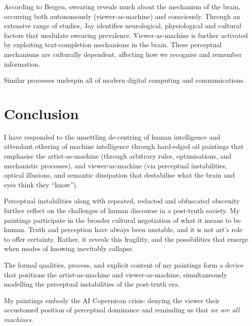 \documentclass[12pt]{article}
\begin{document}
According to Bergen, swearing reveals much about the mechanism of the
brain, occurring both autonomously (viewer-as-machine) and
consciously.\cite{bergen2018what} Through an extensive range of
studies, Jay identifies neurological, physiological and cultural
factors that modulate swearing prevalence.\cite{jay1999why}
Viewer-as-machine is further activated by exploiting text-completion
mechanisms in the
brain.\cite{Taylor1953,Reicher1969,Healy1976,GraingerWhitney2004,CohenDehaene2000,Levy2008} These
perceptual mechanisms are culturally
dependent,\cite{Bartlett1932,Hall1976,ChuaBolandNisbett2005,MasudaNisbett2001}
affecting how we recognise and remember information.

Similar processes underpin all of modern digital computing and
communications.\cite{shannon1948}

\section{Conclusion}
I have responded to the unsettling de-centring of human intelligence
and attendant othering of machine intelligence through hard-edged oil
paintings that emphasise the artist-as-machine (through
arbitrary rules, optimisations, and mechanistic processes), and
viewer-as-machine (via perceptual instabilities, optical illusions,
and semantic dissipation that destabilise what the brain and eyes
think they ``know'').

Perceptual instabilities along with repeated, redacted and obfuscated
obscenity further reflect on the challenges of human discourse in a
post-truth society. My paintings participate in the broader cultural
negotiation of what it means to be human. Truth and perception have
always been unstable, and it is not art's role to offer
certainty. Rather, it reveals this fragility, and the possibilities
that emerge when modes of knowing inevitably collapse.

The formal qualities, process, and explicit content of my paintings
form a device that positions the artist-as-machine and viewer-as-machine,
simultaneously modelling the perceptual instabilities of the
post-truth era.

My paintings embody the AI Copernican crisis:
denying the viewer their accustomed position of perceptual dominance
and reminding us that \emph{we are all machines}.
\end{document}
